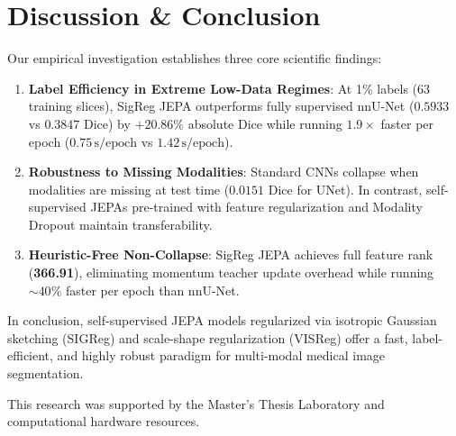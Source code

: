 \documentclass{article}
\begin{document}
\section{Discussion \& Conclusion}

Our empirical investigation establishes three core scientific findings:
\begin{enumerate}
    \item \textbf{Label Efficiency in Extreme Low-Data Regimes}: At 1\% labels ($63$ training slices), SigReg JEPA outperforms fully supervised nnU-Net ($0.5933$ vs $0.3847$ Dice) by $+20.86\%$ absolute Dice while running $1.9\times$ faster per epoch ($0.75\,\text{s/epoch}$ vs $1.42\,\text{s/epoch}$).
    \item \textbf{Robustness to Missing Modalities}: Standard CNNs collapse when modalities are missing at test time ($0.0151$ Dice for UNet). In contrast, self-supervised JEPAs pre-trained with feature regularization and Modality Dropout maintain transferability.
    \item \textbf{Heuristic-Free Non-Collapse}: SigReg JEPA achieves full feature rank (\textbf{366.91}), eliminating momentum teacher update overhead while running $\sim 40\%$ faster per epoch than nnU-Net.
\end{enumerate}

In conclusion, self-supervised JEPA models regularized via isotropic Gaussian sketching (SIGReg) and scale-shape regularization (VISReg) offer a fast, label-efficient, and highly robust paradigm for multi-modal medical image segmentation.


\begin{ack}
This research was supported by the Master's Thesis Laboratory and computational hardware resources.
\end{ack}




\end{document}
